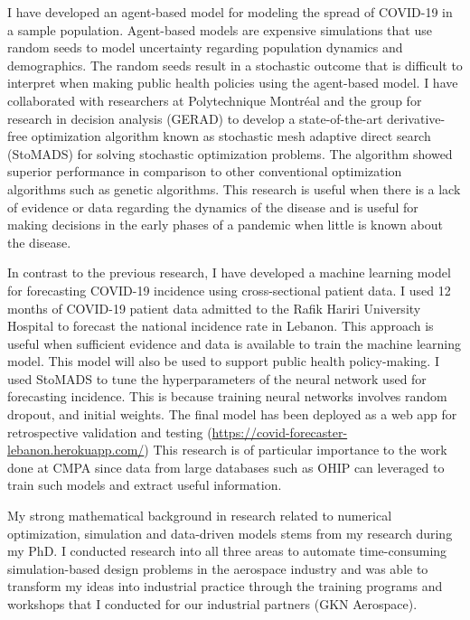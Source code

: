 \documentclass[12pt]{article} %
\begin{document}
\medskip %

I have developed an agent-based model for modeling the spread of COVID-19 in a sample population. Agent-based models are expensive simulations that use random seeds to model uncertainty regarding population dynamics and demographics. The random seeds result in a stochastic outcome that is difficult to interpret when making public health policies using the agent-based model. I have collaborated with researchers at Polytechnique Montréal and the group for research in decision analysis (GERAD) to develop a state-of-the-art derivative-free optimization algorithm known as stochastic mesh adaptive direct search (StoMADS) for solving stochastic optimization problems. The algorithm showed superior performance in comparison to other conventional optimization algorithms such as genetic algorithms. This research is useful when there is a lack of evidence or data regarding the dynamics of the disease and is useful for making decisions in the early phases of a pandemic when little is known about the disease.

\medskip %

In contrast to the previous research, I have developed a machine learning model for forecasting COVID-19 incidence using cross-sectional patient data. I used 12 months of COVID-19 patient data admitted to the Rafik Hariri University Hospital to forecast the national incidence rate in Lebanon. This approach is useful when sufficient evidence and data is available to train the machine learning model. This model will also be used to support public health policy-making. I used StoMADS to tune the hyperparameters of the neural network used for forecasting incidence. This is because training neural networks involves random dropout, and initial weights. The final model has been deployed as a web app for retrospective validation and testing (\href{https://covid-forecaster-lebanon.herokuapp.com/}{https://covid-forecaster-lebanon.herokuapp.com/}) This research is of particular importance to the work done at CMPA since data from large databases such as OHIP can leveraged to train such models and extract useful information.

\medskip %

My strong mathematical background in research related to numerical optimization, simulation and data-driven models stems from my research during my PhD. I conducted research into all three areas to automate time-consuming simulation-based design problems in the aerospace industry and was able to transform my ideas into industrial practice through the training programs and workshops that I conducted for our industrial partners (GKN Aerospace).
\end{document}
